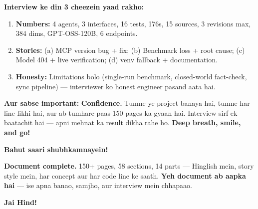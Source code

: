 \begin{designbox}
\textbf{Interview ke din 3 cheezein yaad rakho:}

\begin{enumerate}[label=\arabic*.]
\item \textbf{Numbers:} 4 agents, 3 interfaces, 16 tests, 176s, 15 sources, 3 revisions max, 384 dims, GPT-OSS-120B, 6 endpoints.
\item \textbf{Stories:} (a) MCP version bug + fix; (b) Benchmark loss + root cause; (c) Model 404 + live verification; (d) venv fallback + documentation.
\item \textbf{Honesty:} Limitations bolo (single-run benchmark, closed-world fact-check, sync pipeline) --- interviewer ko honest engineer pasand aata hai.
\end{enumerate}

\textbf{Aur sabse important:} \textbf{Confidence.} Tumne ye project banaya hai, tumne har line likhi hai, aur ab tumhare paas 150 pages ka gyaan hai. Interview sirf ek baatachit hai --- apni mehnat ka result dikha rahe ho. \textbf{Deep breath, smile, and go!}

\textbf{Bahut saari shubhkamnayein!} \faRocket
\end{designbox}

\begin{storybox}
\textbf{Document complete.} 150+ pages, 58 sections, 14 parts --- Hinglish mein, story style mein, har concept aur har code line ke saath. \textbf{Yeh document ab aapka hai} --- ise apna banao, samjho, aur interview mein chhapaao.

\textbf{Jai Hind!}
\end{storybox}
